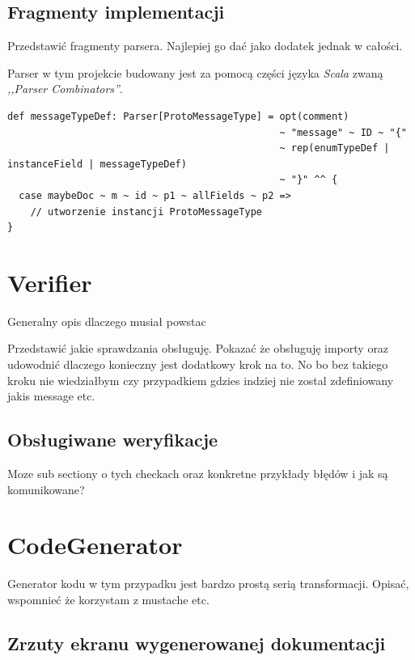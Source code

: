 \subsection{Fragmenty implementacji}
Przedstawić fragmenty parsera. Najlepiej go dać jako dodatek jednak w całości.

Parser w tym projekcie budowany jest za pomocą części języka \textit{Scala} zwaną \textit{,,Parser Combinators''}.

\begin{lstlisting}
def messageTypeDef: Parser[ProtoMessageType] = opt(comment) 
                                               ~ "message" ~ ID ~ "{" 
                                               ~ rep(enumTypeDef | instanceField | messageTypeDef) 
                                               ~ "}" ^^ {
  case maybeDoc ~ m ~ id ~ p1 ~ allFields ~ p2 =>
    // utworzenie instancji ProtoMessageType
}
\end{lstlisting}


\section{Verifier}
Generalny opis dlaczego musiał powstac

Przedstawić jakie sprawdzania obsługuję. 
Pokazać że obsługuję importy oraz udowodnić dlaczego konieczny jest dodatkowy krok na to.
No bo bez takiego kroku nie wiedziałbym czy przypadkiem gdzies indziej nie zostal zdefiniowany jakis message etc.

\subsection{Obsługiwane weryfikacje}
Moze sub sectiony o tych checkach oraz konkretne przykłady błędów i jak są komunikowane?


\section{CodeGenerator}
Generator kodu w tym przypadku jest bardzo prostą serią transformacji.
Opisać, wspomnieć że korzystam z mustache etc.

\subsection{Zrzuty ekranu wygenerowanej dokumentacji}
\label{sec:screenshots}

